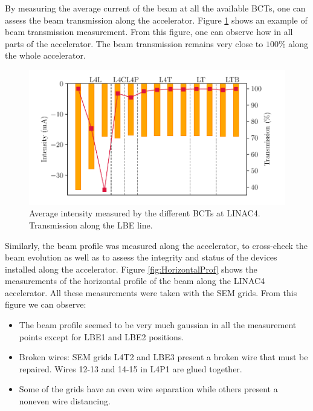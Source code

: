 By measuring the average current of the beam at all the available BCTs, one can assess the beam transmission along the accelerator. Figure \ref{fig:BeamTrans} shows an example of beam transmission measurement. From this figure, one can observe how in all parts of the accelerator. The beam transmission remains very close to $100 \%$ along the whole accelerator. 

\begin{figure}[h]
    \centering
    \includegraphics[width=\columnwidth]{BCT_Transmission/TransmissionBCT.pdf}
    \caption{Average intensity measured by the different BCTs at LINAC4. Transmission along the LBE line.}
    \label{fig:BeamTrans}
\end{figure}

Similarly, the beam profile was measured along the accelerator, to cross-check the beam evolution as well as to assess the integrity and status of the devices installed along the accelerator.  Figure \ref{fig:HorizontalProf} shows the measurements of the horizontal profile of the beam along the LINAC4 accelerator. All these measurements were taken with the SEM grids. From this figure we can observe:

\begin{itemize}
    \item The beam profile seemed to be very much gaussian in all the measurement points except for LBE1 and LBE2 positions.
    \item Broken wires: SEM grids L4T2 and LBE3 present a broken wire that must be repaired. Wires 12-13 and 14-15 in L4P1 are glued together. 
    \item Some of the grids have an even wire separation while others present a noneven wire distancing. 
\end{itemize}

